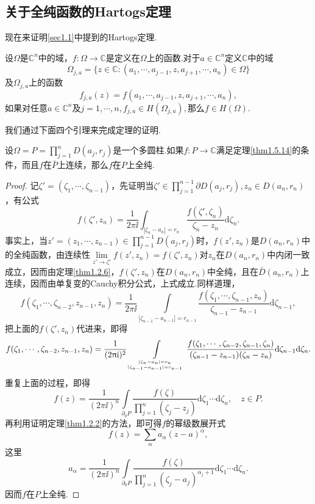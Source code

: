 \subsection{关于全纯函数的Hartogs定理}
现在来证明\ref{sec1.1}中提到的Hartogs定理.
\begin{theorem}\label{thm1.5.14}
	设$\Omega$是$\mathbb{C}^n$中的域，$f\colon\Omega\to\mathbb{C}$是定义在$\Omega$上的函数.对于$a\in\mathbb{C}^n$定义$\mathbb{C}$中的域
	\[\Omega_{j,a}=\{z\in\mathbb{C}\colon(a_1,\cdots,a_{j-1},z,a_{j+1},\cdots,a_n)\in\Omega\}\]
	及$\Omega_{j,a}$上的函数
	\[f_{j,a}(z)=f(a_1,\cdots,a_{j-1},z,a_{j+1},\cdots,a_n),\]
	如果对任意$a\in\mathbb{C}^n$及$j=1,\cdots,n,f_{j,a}\in H(\Omega_{j,a}),$那么$f\in H(\Omega).$
\end{theorem}
我们通过下面四个引理来完成定理的证明.
\begin{lemma}\label{lem1.5.15}
	设$\Omega=P=\prod\limits_{j=1}^{n}D(a_j,r_j)$是一个多圆柱.如果$f\colon P\to\mathbb{C}$满足定理\ref{thm1.5.14}的条件，而且$f$在$\bar{P}$上连续，那么$f$在$P$上全纯.
\end{lemma}
\begin{proof}
	记$\zeta'=(\zeta_1,\cdots,\zeta_{n-1})$，先证明当$\zeta'\in\prod\limits_{j=1}^{n-1}\partial D(a_j,r_j),z_n\in D(a_n,r_n)$，有公式
	\[f(\zeta',z_n)=\frac1{2\pi\ii}\int_{|\zeta_n-a_n|=r_n}\frac{f(\zeta',\zeta_n)}{\zeta_n-z_n}\mathrm{d}\zeta_n.\]
	事实上，当$z'=(z_1,\cdots,z_{n-1})\in\prod\limits_{j=1}^{n-1}D(a_j,r_j)$时，$f(z',z_n)$是$D(a_n,r_n)$中的全纯函数，由连续性$\lim\limits_{z'\to\zeta'}f(z',z_n)=f(\zeta',z_n)$对$z_n$在$D(a_n,r_n)$中内闭一致成立，因而由定理\ref{thm1.2.6}，$f(\zeta',z_n)$在$D(a_n,r_n)$中全纯，且在$\bar{D}(a_n,r_n)$上连续，因而由单复变的Cauchy积分公式，上式成立.同样道理，
\[
		f(\zeta_1,\cdots,\zeta_{n-2},z_{n-1},z_n)
		=\frac1{2\pi\ii}\int\limits_{|\zeta_{n-1}-a_{n-1}|=r_{n-1}}\frac{f(\zeta_1,\cdots,\zeta_{n-1},z_n)}{\zeta_{n-1}-z_{n-1}}\mathrm{d}\zeta_{n-1},
\]
把上面的$f(\zeta',z_n)$代进来，即得
\[
	f(\zeta_1,\cdots,\zeta_{n-2},z_{n-1},z_n)
	=\frac1{(2\uppi\mathrm i)^2}\int\limits_{|\zeta_n-a_n|=r_n\atop |\zeta_{n-1}-a_{n-1}|=r_{n-1}}\frac{f(\zeta_1,\cdots,\zeta_{n-2},\zeta_{n-1},\zeta_n)}{(\zeta_{n-1}-z_{n-1})(\zeta_n-z_n)}\mathrm{d}\zeta_{n-1}\mathrm{d}\zeta_n.
\]
重复上面的过程，即得
\[f(z)=\frac1{(2\pi\ii)^n}\int\limits_{\partial_0 P}\frac{f(\zeta)}{\prod\limits_{j=1}^n(\zeta_j-z_j)}\mathrm{d}\zeta_1\cdots\mathrm{d}\zeta_n,\quad z\in P.\]
再利用证明定理\ref{thm1.2.2}的方法，即可得$f$的幂级数展开式
\[f(z)=\sum_\alpha a_\alpha(z-a)^\alpha,\]
这里
\[a_\alpha=\frac1{(2\pi\ii)^n}\int\limits_{\partial_0 P}\frac{f(\zeta)}{\prod\limits_{j=1}^n (\zeta_j-a_j)^{\alpha_j+1}}\mathrm{d}\zeta_1\cdots\mathrm{d}\zeta_n.\]
因而$f$在$P$上全纯.
\end{proof}
